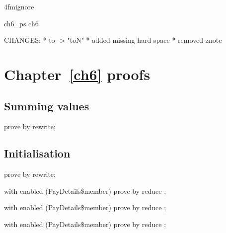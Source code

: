 \ai4fmignore{
\begin{zsection}
  \SECTION ch6\_ps \parents ch6
\end{zsection}
CHANGES:
* to -> "toN"
* added missing hard space
* removed znote
}

\chapter{Chapter~\ref{ch6} proofs}

\section{Summing values}

\begin{LDCheck}\begin{zproof}
   prove by rewrite;
\end{zproof}\end{LDCheck}

\section{Initialisation}

\begin{LDCheck}\begin{zproof}
   prove by rewrite;
\end{zproof}\end{LDCheck}


\begin{LPScript}\begin{zproof}[fPayDetailsFromType]
   with enabled (PayDetails\$member) prove by reduce ;
\end{zproof}\end{LPScript}

\begin{LPScript}\begin{zproof}[fPayDetailsToType]
   with enabled (PayDetails\$member) prove by reduce ;
\end{zproof}\end{LPScript}

\begin{LPScript}\begin{zproof}[fPayDetailsValueType]
   with enabled (PayDetails\$member) prove by reduce ;
\end{zproof}\end{LPScript}

